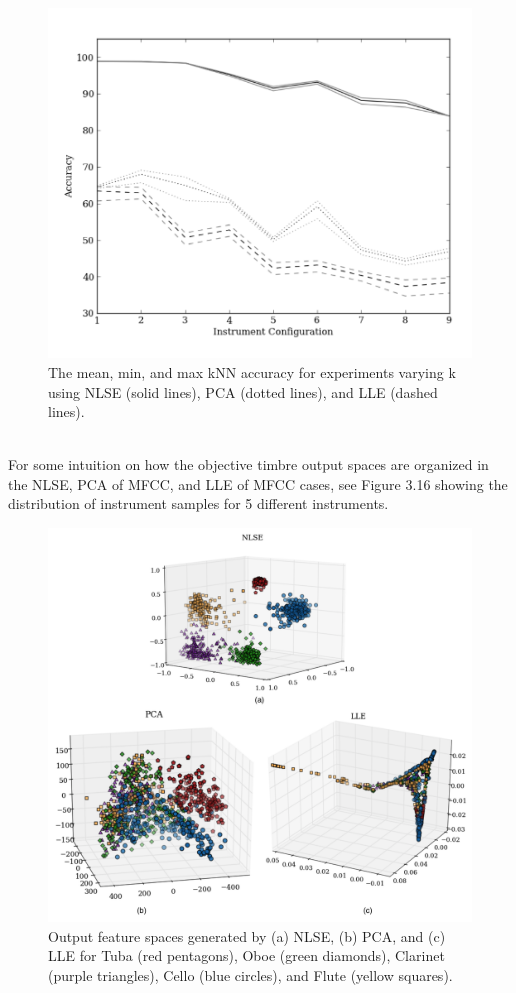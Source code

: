 \documentclass[a4paper,12pt]{report} 	%
\numberwithin{figure}{chapter}
\numberwithin{table}{chapter}
\numberwithin{equation}{chapter}
\begin{document}
\begin{flushleft}
\begin{figure}[h!]
\begin{center}
\includegraphics[scale=0.85]{CNN_kNN}
\caption[kNN accuracy for NLSE, PCA, and LLE]{The mean, min, and max kNN accuracy for experiments varying k using NLSE (solid lines), PCA (dotted lines), and LLE (dashed lines).}
\end{center}
\end{figure}
\\
For some intuition on how the objective timbre output spaces are organized in the NLSE, PCA of MFCC, and LLE of MFCC cases, see Figure 3.16 showing the distribution of instrument samples for 5 different instruments.
\begin{figure}[h!]
\begin{center}
\includegraphics[scale=0.55]{NLSECluster}
\caption[NLSE vs. PCA vs. LLE Instrument Clusters]{Output feature spaces generated by (a) NLSE, (b) PCA, and (c) LLE for Tuba (red pentagons), Oboe (green diamonds), Clarinet (purple triangles), Cello (blue circles), and Flute (yellow squares).}
\end{center}
\end{figure}
\\

\end{flushleft}
\end{document}
